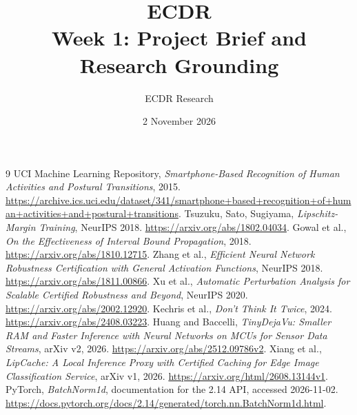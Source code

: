 \documentclass[11pt,a4paper]{article}
\begin{document}
\title{\textcolor{ink}{ECDR}\\[5pt]\Large Week 1: Project Brief and Research Grounding}
\author{ECDR Research}\date{2 November 2026}
\maketitle\tableofcontents\clearpage

\begin{thebibliography}{9}
 UCI Machine Learning Repository, \emph{Smartphone-Based Recognition of Human Activities and Postural Transitions}, 2015. \url{https://archive.ics.uci.edu/dataset/341/smartphone+based+recognition+of+human+activities+and+postural+transitions}.
 Tsuzuku, Sato, Sugiyama, \emph{Lipschitz-Margin Training}, NeurIPS 2018. \url{https://arxiv.org/abs/1802.04034}.
 Gowal et al., \emph{On the Effectiveness of Interval Bound Propagation}, 2018. \url{https://arxiv.org/abs/1810.12715}.
 Zhang et al., \emph{Efficient Neural Network Robustness Certification with General Activation Functions}, NeurIPS 2018. \url{https://arxiv.org/abs/1811.00866}.
 Xu et al., \emph{Automatic Perturbation Analysis for Scalable Certified Robustness and Beyond}, NeurIPS 2020. \url{https://arxiv.org/abs/2002.12920}.
 Kechris et al., \emph{Don't Think It Twice}, 2024. \url{https://arxiv.org/abs/2408.03223}.
 Huang and Baccelli, \emph{TinyDejaVu: Smaller RAM and Faster Inference with Neural Networks on MCUs for Sensor Data Streams}, arXiv v2, 2026. \url{https://arxiv.org/abs/2512.09786v2}.
 Xiang et al., \emph{LipCache: A Local Inference Proxy with Certified Caching for Edge Image Classification Service}, arXiv v1, 2026. \url{https://arxiv.org/html/2608.13144v1}.
 PyTorch, \emph{BatchNorm1d}, documentation for the 2.14 API, accessed 2026-11-02. \url{https://docs.pytorch.org/docs/2.14/generated/torch.nn.BatchNorm1d.html}.
\end{thebibliography}
\end{document}
